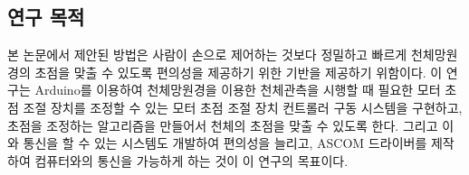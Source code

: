 
\subsection{연구 목적}

본 논문에서 제안된 방법은 사람이 손으로 제어하는 것보다 정밀하고 빠르게 천체망원경의 초점을 맞출 수 있도록 편의성을 제공하기 위한 기반을 제공하기 위함이다. 이 연구는 Arduino를 이용하여 천체망원경을 이용한 천체관측을 시행할 때 필요한 모터 초점 조절 장치를 조정할 수 있는 모터 초점 조절 장치 컨트롤러 구동 시스템을 구현하고, 초점을 조정하는 알고리즘을 만들어서 천체의 초점을 맞출 수 있도록 한다. 그리고 이와 통신을 할 수 있는 시스템도 개발하여 편의성을 늘리고, ASCOM 드라이버를 제작하여 컴퓨터와의 통신을 가능하게 하는 것이 이 연구의 목표이다.
